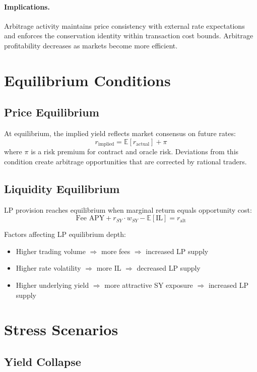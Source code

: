 \paragraph{Implications.}
Arbitrage activity maintains price consistency with external rate expectations and enforces the conservation identity within transaction cost bounds. Arbitrage profitability decreases as markets become more efficient.

\section{Equilibrium Conditions}

\subsection{Price Equilibrium}

At equilibrium, the implied yield reflects market consensus on future rates:
\[
r_{\mathrm{implied}} = \mathbb{E}[r_{\mathrm{actual}}] + \pi
\]
where $\pi$ is a risk premium for contract and oracle risk. Deviations from this condition create arbitrage opportunities that are corrected by rational traders.

\subsection{Liquidity Equilibrium}

LP provision reaches equilibrium when marginal return equals opportunity cost:
\[
\text{Fee APY} + r_{SY} \cdot w_{SY} - \mathbb{E}[\text{IL}] = r_{\mathrm{alt}}
\]

Factors affecting LP equilibrium depth:
\begin{itemize}
\item Higher trading volume $\Rightarrow$ more fees $\Rightarrow$ increased LP supply
\item Higher rate volatility $\Rightarrow$ more IL $\Rightarrow$ decreased LP supply
\item Higher underlying yield $\Rightarrow$ more attractive SY exposure $\Rightarrow$ increased LP supply
\end{itemize}

\section{Stress Scenarios}

\subsection{Yield Collapse}

